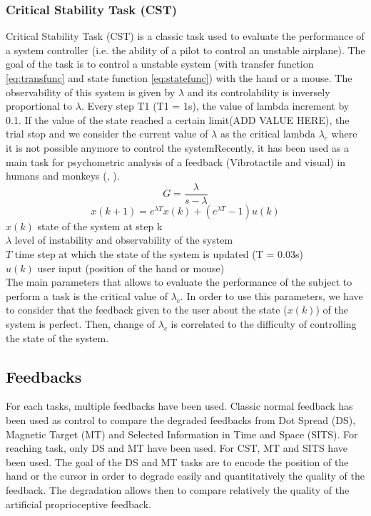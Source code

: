 \documentclass[preprint,12pt]{elsarticle}
\begin{document}
\subsubsection{Critical Stability Task (CST)}
Critical Stability Task (CST) is a classic task used to evaluate the performance of a system controller (i.e. the ability of a pilot to control an unstable airplane). The goal of the task is to control a unstable system (with transfer function \ref{eq:transfunc} and state function \ref{eq:statefunc}) with the hand or a mouse. The observability of this system is given by $\lambda$ and its controlability is inversely proportional to $\lambda$. Every step T1 (T1 = 1s), the value of lambda increment by 0.1. If the value of the state reached a certain limit(ADD VALUE HERE), the trial stop and we consider the current value of $\lambda$ as the critical lambda $\lambda_c$ where it is not possible anymore to control the systemRecently, it has been used as a main task for psychometric analysis of a feedback (Vibrotactile and visual) in humans and monkeys (\citet{Quick2014}, \citet{Quick2015}).
\begin{equation} 
G = \frac{\lambda}{s-\lambda}
\label{eq:transfunc}
\end{equation}
\begin{equation} 
x(k+1) = e^{\lambda T}x(k) + (e^{\lambda T} - 1)u(k)
\label{eq:statefunc}
\end{equation}
$x(k)$ state of the system at step k\\
$\lambda$ level of instability and observability of the system\\
$T$ time step at which the state of the system is updated (T = 0.03s) \\
$u(k)$ user input (position of the hand or mouse)\\

The main parameters that allows to evaluate the performance of the subject to perform a task is the critical value of $\lambda_c$. In order to use this parameters, we have to consider that the feedback given to the user about the state ($x(k)$) of the system is perfect. Then, change of $\lambda_c$ is correlated to the difficulty of controlling the state of the system.
\subsection{Feedbacks}
For each tasks, multiple feedbacks have been used. Classic normal feedback has been used as control to compare the degraded feedbacks from Dot Spread (DS), Magnetic Target (MT) and Selected Information in Time and Space (SITS). For reaching task, only DS and MT have been used. For CST, MT and SITS have been used. The goal of the DS and MT tasks are to encode the position of the hand or the cursor in order to degrade easily and quantitatively the quality of the feedback. The degradation allows then to compare relatively the quality of the artificial proprioceptive feedback.
\end{document}

